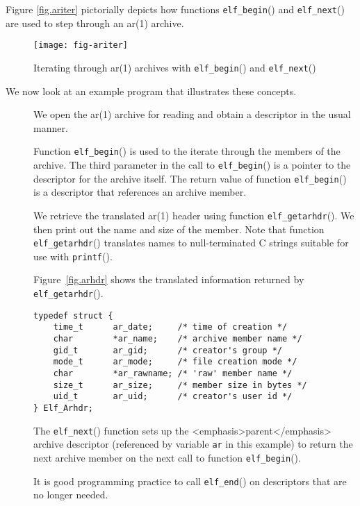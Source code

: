 \documentclass[a4paper]{book}
\makeatletter
\newcommand{\function}[1]{\texttt{#1}()}
\newcommand{\parameter}[1]{\texttt{#1}}
\newcommand{\type}[1]{\texttt{#1}}
\newenvironment{callout}[2][blue]{%
  \begingroup\newcommand{\@cocolor}{#1}%
  \newcommand{\@cogroup}[1]{#2}}{\endgroup}
\newcommand{\@co}[1]{\framebox{\textbf{\color{\@cocolor}#1}}}
\newcommand{\coref}[1]{%
  \hypertarget{\@cogroup.#1.cr}{%
    \hyperlink{\@cogroup.#1.co}{\@co{#1}}}}
\makeatother
\begin{document}
Figure \vref{fig.ariter} pictorially depicts how functions
\function{elf\_begin} and \function{elf\_next} are used to step through
an ar(1) archive.

\begin{figure}
  \begin{center}
    \texttt{[image: fig-ariter]}
  \end{center}
  \caption{Iterating through ar(1) archives with
    \function{elf\_begin} and \function{elf\_next}}\label{fig.ariter}
\end{figure}

We now look at an example program that illustrates these concepts.

\begin{callout}{prog6}
  

  \begin{description}
  \item[\coref{1} \coref{2}] We open the ar(1) archive for reading
    and obtain a descriptor in the usual manner.
  \item[\coref{3}] Function \function{elf\_begin} is used to the
    iterate through the members of the archive.  The third parameter
    in the call to \function{elf\_begin} is a pointer to the
    descriptor for the archive itself.  The return value of function
    \function{elf\_begin} is a descriptor that references an archive
    member.
  \item[\coref{4}] We retrieve the translated ar(1) header using
    function \function{elf\_getarhdr}.  We then print out the name and
    size of the member.  Note that function \function{elf\_getarhdr}
    translates names to null-terminated C strings suitable for use
    with \function{printf}.

    Figure~\vref{fig.arhdr} shows the translated information returned
    by \function{elf\_getarhdr}.

    \begin{lstlisting}[caption=The \type{Elf\_Arhdr} Structure,
        label=fig.arhdr, basicstyle=\small]
typedef struct {
    time_t      ar_date;     /* time of creation */
    char        *ar_name;    /* archive member name */
    gid_t       ar_gid;      /* creator's group */
    mode_t      ar_mode;     /* file creation mode */
    char        *ar_rawname; /* 'raw' member name */
    size_t      ar_size;     /* member size in bytes */
    uid_t       ar_uid;      /* creator's user id */
} Elf_Arhdr;
    \end{lstlisting}
  \item[\coref{5}] The \function{elf\_next} function sets up the
    <emphasis>parent</emphasis> archive descriptor (referenced by
    variable \parameter{ar} in this example) to return the next
    archive member on the next call to function \function{elf\_begin}.
  \item[\coref{6}] It is good programming practice to call
    \function{elf\_end} on descriptors that are no longer needed.
  \end{description}
\end{callout}
\end{document}
